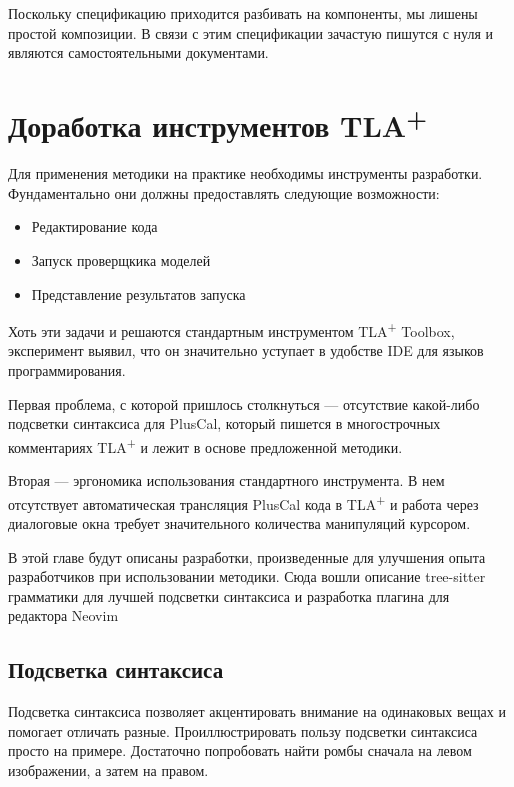 \documentclass[14pt, openany]{report}
\newcommand{\tlapl}{TLA\textsuperscript{+} }
\begin{document}
Поскольку спецификацию приходится разбивать на компоненты, мы лишены простой композиции. В связи с этим спецификации зачастую пишутся с нуля и являются самостоятельными документами.

\chapter{Доработка инструментов \tlapl}
Для применения методики на практике необходимы инструменты разработки. Фундаментально они должны предоставлять следующие возможности:
\begin{itemize}
  \item Редактирование кода
  \item Запуск проверщкика моделей
  \item Представление результатов запуска
\end{itemize}

Хоть эти задачи и решаются стандартным инструментом \tlapl Toolbox, эксперимент выявил, что он значительно уступает в удобстве IDE для языков программирования.

Первая проблема, с которой пришлось столкнуться --- отсутствие какой-либо подсветки синтаксиса для PlusCal, который пишется в многострочных комментариях \tlapl и лежит в основе предложенной методики. 

Вторая --- эргономика использования стандартного инструмента. В нем отсутствует автоматическая трансляция PlusCal кода в \tlapl и работа через диалоговые окна требует значительного количества манипуляций курсором.

В этой главе будут описаны разработки, произведенные для улучшения опыта разработчиков при использовании методики. Сюда вошли описание tree-sitter \cite{treeSitter} грамматики для лучшей подсветки синтаксиса и разработка плагина для редактора Neovim \cite{nvim}

\section{Подсветка синтаксиса}
Подсветка синтаксиса позволяет акцентировать внимание на одинаковых вещах и помогает отличать разные. Проиллюстрировать пользу подсветки синтаксиса просто на примере. Достаточно попробовать найти ромбы сначала на левом изображении, а затем на правом.
\end{document}
